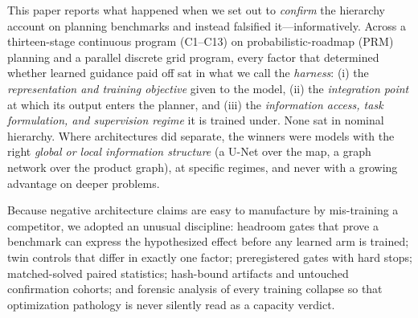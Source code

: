 \documentclass[letterpaper]{article} %
\newcommand{\stage}[1]{\textsc{#1}}
\begin{document}
This paper reports what happened when we set out to \emph{confirm} the hierarchy account on planning benchmarks and instead falsified it---informatively. Across a thirteen-stage continuous program (\stage{C1}--\stage{C13}) on probabilistic-roadmap (PRM) planning \citep{kavraki1996prm} and a parallel discrete grid program, every factor that determined whether learned guidance paid off sat in what we call the \emph{harness}: (i) the \emph{representation and training objective} given to the model, (ii) the \emph{integration point} at which its output enters the planner, and (iii) the \emph{information access, task formulation, and supervision regime} it is trained under. None sat in nominal hierarchy. Where architectures did separate, the winners were models with the right \emph{global or local information structure} (a U-Net over the map, a graph network over the product graph), at specific regimes, and never with a growing advantage on deeper problems.

Because negative architecture claims are easy to manufacture by mis-training a competitor, we adopted an unusual discipline: headroom gates that prove a benchmark can express the hypothesized effect before any learned arm is trained; twin controls that differ in exactly one factor; preregistered gates with hard stops; matched-solved paired statistics; hash-bound artifacts and untouched confirmation cohorts; and forensic analysis of every training collapse so that optimization pathology is never silently read as a capacity verdict.
\end{document}
